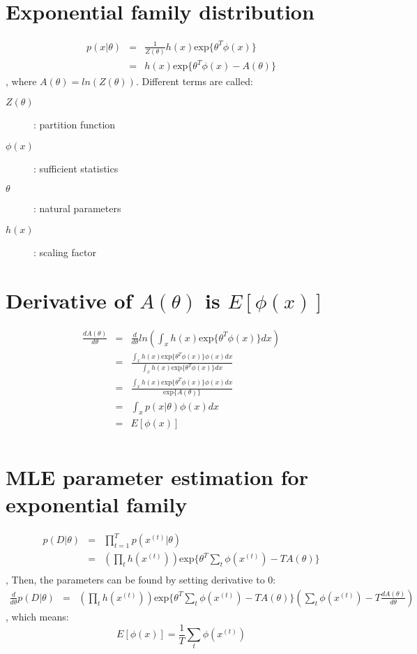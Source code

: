 \documentclass[11pts]{article}
\begin{document}
\section{Exponential family distribution}
\begin{eqnarray*}
p(x|\theta) & = & \frac{1}{Z(\theta)} h(x) \mathrm{exp}\{\theta^T \phi(x)\} \\
& = & h(x)\mathrm{exp}\{\theta^T \phi(x) - A(\theta)\}
\end{eqnarray*}
, where $A(\theta) = ln(Z(\theta))$. Different terms are called:

\begin{description}
\item[$Z(\theta)$]: partition function
\item[$\phi(x)$]: sufficient statistics
\item[$\theta$]: natural parameters
\item[$h(x)$]: scaling factor
\end{description}

\section{Derivative of $A(\theta)$ is $E[\phi(x)]$}
\begin{eqnarray*}
\frac{dA(\theta)}{d\theta} & = & \frac{d}{d\theta}ln(\int_x h(x)\mathrm{exp}\{\theta^T \phi(x)\}dx)\\
& = & \frac{\int_x h(x)\mathrm{exp}\{\theta^T\phi(x)\}\phi(x)dx}{\int_x h(x)\mathrm{exp}\{\theta^T\phi(x)\}dx} \\
& = & \frac{\int_x h(x)\mathrm{exp}\{\theta^T\phi(x)\}\phi(x)dx}{\mathrm{exp}\{A(\theta)\}} \\
& = & \int_x p(x|\theta)\phi(x)dx \\
& = & E[\phi(x)] \\ 
\end{eqnarray*}

\section{MLE parameter estimation for exponential family}
\begin{eqnarray*}
p(D|\theta) & = & \prod_{t=1}^T p(x^{(t)}|\theta) \\
& = & (\prod_t h(x^{(t)})) \mathrm{exp}\{\theta^T \sum_t \phi(x^{(t)}) - TA(\theta)\} \\
\end{eqnarray*}
, Then, the parameters can be found by setting derivative to $0$:
\begin{eqnarray*}
\frac{d}{d\theta} p(D|\theta) & = & (\prod_t h(x^{(t)}))\mathrm{exp}\{\theta^T \sum_t\phi(x^{(t)}) - TA(\theta)\}(\sum_t \phi(x^{(t)}) - T\frac{dA(\theta)}{d\theta})
\end{eqnarray*}
, which means:
\[
E[\phi(x)] = \frac{1}{T}\sum_t \phi(x^{(t)})
\]
\end{document}

